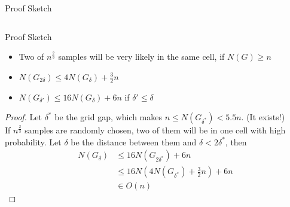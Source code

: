 \documentclass[18pt]{beamer}
\begin{document}
\begin{frame}{Proof Sketch}
\begin{columns}

\end{columns}

\end{frame}

\begin{frame}{Proof Sketch}
\begin{itemize}
\item Two of $n^{\frac{2}{3}}$ samples will be very likely in the same cell, if $N(G) \geq n$ 
\item $N(G_{2\delta}) \leq 4N(G_\delta) + \frac{3}{2}n$
\item $N(G_{\delta'}) \leq 16N(G_\delta) + 6n$ \hspace{2em} if $\delta' \leq \delta$
\end{itemize}

\begin{proof}
Let $\delta^*$ be the grid gap, which makes $n \leq N(G_{\delta^*}) < 5.5n$. (It exists!) \\
If $n^{\frac{2}{3}}$ samples are randomly chosen, two of them will be in one cell with high probability. Let $\delta$ be the distance between them and $\delta < 2\delta^*$, then
\begin{align*}
N(G_{\delta})  &\leq 16N(G_{2\delta^*}) + 6n \\
               &\leq 16N(4N(G_{\delta^*})+\frac{3}{2}n)+6n \\
               &\in O(n)
\end{align*}
 
\end{proof}

\end{frame}

%

\appendix
\beginbackup
\end{document}
